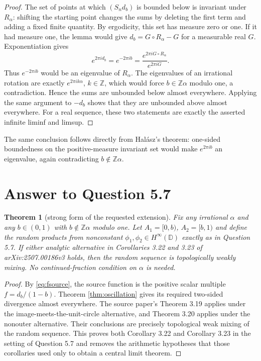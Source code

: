 \documentclass[11pt]{article}
\newtheorem{theorem}{Theorem}
\newcommand{\Z}{\mathbb Z}
\newcommand{\D}{\mathbb D}
\begin{document}
\begin{proof}
The set of points at which $(S_nd_b)$ is bounded below is invariant under
$R_\alpha$: shifting the starting point changes the sums by deleting the first
term and adding a fixed finite quantity.  By ergodicity, this set has measure
zero or one.  If it had measure one, the lemma would give
$d_b=G\circ R_\alpha-G$ for a measurable real $G$.  Exponentiation gives
\[
 e^{2\pi i d_b}=e^{-2\pi i b}
   =\frac{e^{2\pi iG\circ R_\alpha}}{e^{2\pi iG}}.
\]
Thus $e^{-2\pi ib}$ would be an eigenvalue of $R_\alpha$.  The eigenvalues of
an irrational rotation are exactly $e^{2\pi ik\alpha}$, $k\in\Z$, which would
force $b\in\Z\alpha$ modulo one, a contradiction.  Hence the sums are
unbounded below almost everywhere.  Applying the same argument to $-d_b$
shows that they are unbounded above almost everywhere.  For a real sequence,
these two statements are exactly the asserted infinite liminf and limsup.
\end{proof}

The same conclusion follows directly from Hal\'asz's theorem: one-sided
boundedness on the positive-measure invariant set would make
$e^{2\pi ib}$ an eigenvalue, again contradicting $b\notin\Z\alpha$.

\section{Answer to Question 5.7}

\begin{theorem}[strong form of the requested extension]
Fix any irrational $\alpha$ and any $b\in(0,1)$ with
$b\notin\Z\alpha$ modulo one.  Let $A_1=[0,b)$, $A_2=[b,1)$ and define the
random products from nonconstant $\phi_1,\phi_2\in H^\infty(\D)$ exactly as
in Question 5.7.  If either analytic alternative in Corollaries 3.22 and 3.23
of arXiv:2507.00186v3 holds, then the random sequence is topologically weakly
mixing.  No continued-fraction condition on $\alpha$ is needed.
\end{theorem}

\begin{proof}
By \eqref{eq:fsource}, the source function is the positive scalar multiple
$f=d_b/(1-b)$.  Theorem \ref{thm:oscillation} gives its required two-sided
divergence almost everywhere.  The source paper's Theorem 3.19 applies under
the image-meets-the-unit-circle alternative, and Theorem 3.20 applies under
the nonouter alternative.  Their conclusions are precisely topological weak
mixing of the random sequence.  This proves both Corollary 3.22 and Corollary
3.23 in the setting of Question 5.7 and removes the arithmetic hypotheses
that those corollaries used only to obtain a central limit theorem.
\end{proof}
\end{document}
